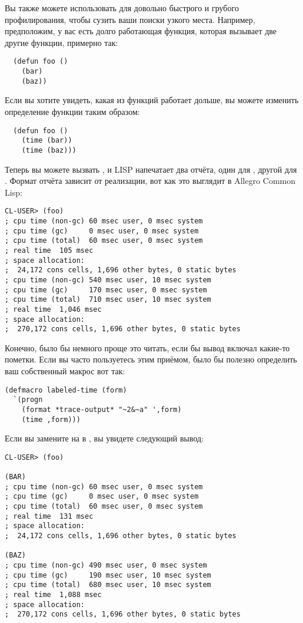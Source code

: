 Вы также можете использовать  для довольно быстрого и грубого профилирования,
чтобы сузить ваши поиски узкого места. Например, предположим, у вас есть долго работающая
функция, которая вызывает две другие функции, примерно так:

\begin{lstlisting}
  (defun foo ()
    (bar)
    (baz))
\end{lstlisting}

Если вы хотите увидеть, какая из функций работает дольше, вы можете изменить определение функции таким образом:

\begin{lstlisting}
  (defun foo ()
    (time (bar))
    (time (baz)))
\end{lstlisting}

Теперь вы можете вызвать , и LISP напечатает два отчёта, один для ,
другой для . Формат отчёта зависит от реализации, вот как это выглядит в Allegro
Common Lisp:

\begin{lstlisting}
CL-USER> (foo)
; cpu time (non-gc) 60 msec user, 0 msec system
; cpu time (gc)     0 msec user, 0 msec system
; cpu time (total)  60 msec user, 0 msec system
; real time  105 msec
; space allocation:
;  24,172 cons cells, 1,696 other bytes, 0 static bytes
; cpu time (non-gc) 540 msec user, 10 msec system
; cpu time (gc)     170 msec user, 0 msec system
; cpu time (total)  710 msec user, 10 msec system
; real time  1,046 msec
; space allocation:
;  270,172 cons cells, 1,696 other bytes, 0 static bytes
\end{lstlisting}

Конечно, было бы немного проще это читать, если бы вывод включал какие-то пометки. Если вы
часто пользуетесь этим приёмом, было бы полезно определить ваш собственный макрос вот так:

\begin{lstlisting}
(defmacro labeled-time (form)
  `(progn
    (format *trace-output* "~2&~a" ',form)
    (time ,form)))
\end{lstlisting}

Если вы замените  на  в , вы увидете следующий
вывод:

\begin{lstlisting}
CL-USER> (foo)

(BAR)
; cpu time (non-gc) 60 msec user, 0 msec system
; cpu time (gc)     0 msec user, 0 msec system
; cpu time (total)  60 msec user, 0 msec system
; real time  131 msec
; space allocation:
;  24,172 cons cells, 1,696 other bytes, 0 static bytes

(BAZ)
; cpu time (non-gc) 490 msec user, 0 msec system
; cpu time (gc)     190 msec user, 10 msec system
; cpu time (total)  680 msec user, 10 msec system
; real time  1,088 msec
; space allocation:
;  270,172 cons cells, 1,696 other bytes, 0 static bytes
\end{lstlisting}


